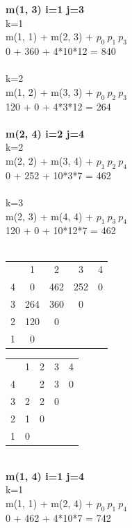 \documentclass{article}
\begin{document}
    \textbf{m(1, 3) i=1 j=3} \\
    k=1 \\
    m(1, 1) + m(2, 3) + $ p_{0}\ p_{1}\  p_{3}$\\
    0 + 360 + 4*10*12 = 840 \\\\

    k=2 \\
    m(1, 2) + m(3, 3) + $ p_{0}\ p_{2}\  p_{3}$\\
    120 + 0 + 4*3*12 = 264\\\\

    \textbf{m(2, 4) i=2 j=4} \\
    k=2 \\
    m(2, 2) + m(3, 4) + $ p_{1}\ p_{2}\  p_{4}$\\
    0 + 252 + 10*3*7 = 462 \\\\

    k=3 \\
    m(2, 3) + m(4, 4) + $ p_{1}\ p_{3}\  p_{4}$\\
    120 + 0 + 10*12*7 = 462\\\\

    \begin{tabular}{ c | c | c | c | c }
            
        & 1 & 2 & 3 & 4 \\ 
    4 & 0 & 462 & 252 & 0 \\  
    3 & 264 & 360 & 0 \\
    2 & 120 & 0 \\
    1 & 0     
    \end{tabular}
    \begin{tabular}{ c | c | c | c | c }
            
        & 1 & 2 & 3 & 4 \\ 
      4 &   & 2 & 3 & 0 \\  
      3 & 2 & 2 & 0 \\
      2 & 1 & 0 \\
      1 & 0     
    \end{tabular}\\

    \textbf{m(1, 4) i=1 j=4} \\
    k=1 \\
    m(1, 1) + m(2, 4) + $ p_{0}\ p_{1}\  p_{4}$\\
    0 + 462 + 4*10*7 = 742 \\\\
\end{document}
